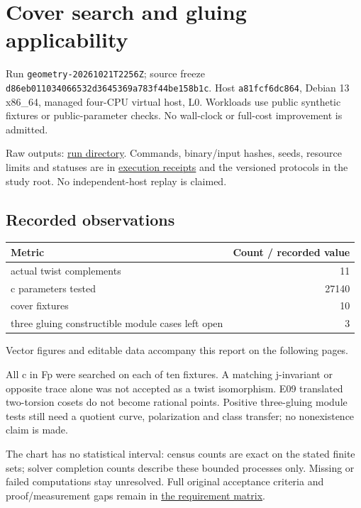 \documentclass[
  10pt,
  letterpaper,
  landscape]{article}
\author{}
\date{}
\begin{document}
\section{Cover search and gluing
applicability}\label{cover-search-and-gluing-applicability}

Run \texttt{geometry-20261021T2256Z}; source freeze
\texttt{d86eb011034066532d3645369a783f44be158b1c}. Host
\texttt{a81fcf6dc864}, Debian 13 x86\_64, managed four-CPU virtual host,
L0. Workloads use public synthetic fixtures or public-parameter checks.
No wall-clock or full-cost improvement is admitted.

Raw outputs:
\href{../../../execution-v1/runs/geometry-20261021T2256Z/}{run
directory}. Commands, binary/input hashes, seeds, resource limits and
statuses are in \href{../../../execution-v1/}{execution receipts} and
the versioned protocols in the study root. No independent-host replay is
claimed.

\subsection{Recorded observations}\label{recorded-observations}

\begin{longtable}[]{@{}lr@{}}
\toprule\noalign{}
Metric & Count / recorded value \\
\midrule\noalign{}
\endhead
\bottomrule\noalign{}
\endlastfoot
actual twist complements & 11 \\
c parameters tested & 27140 \\
cover fixtures & 10 \\
three gluing constructible module cases left open & 3 \\
\end{longtable}

Vector figures and editable data accompany this report on the following pages.

All c in Fp were searched on each of ten fixtures. A matching
j-invariant or opposite trace alone was not accepted as a twist
isomorphism. E09 translated two-torsion cosets do not become rational
points. Positive three-gluing module tests still need a quotient curve,
polarization and class transfer; no nonexistence claim is made.

The chart has no statistical interval: census counts are exact on the
stated finite sets; solver completion counts describe these bounded
processes only. Missing or failed computations stay unresolved. Full
original acceptance criteria and proof/measurement gaps remain in
\href{../../../EXPERIMENTS.md}{the requirement matrix}.
\end{document}
